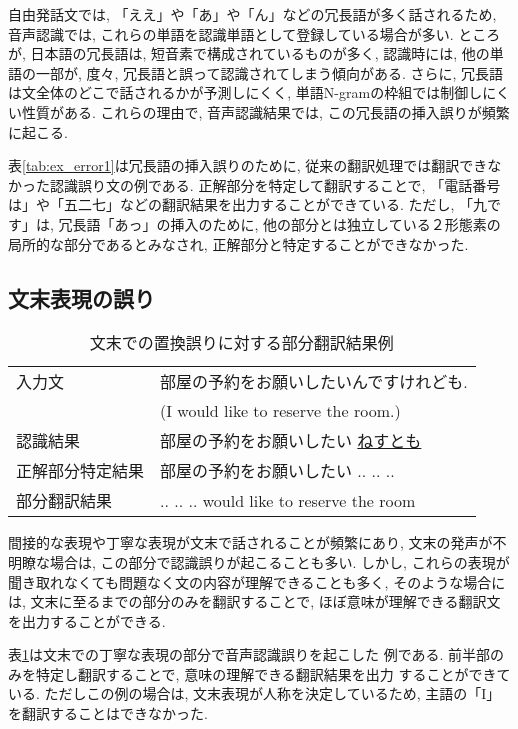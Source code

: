 自由発話文では, 「ええ」や「あ」や「ん」などの冗長語が多く話されるため, 
音声認識では, これらの単語を認識単語として登録している場合が多い. 
ところが, 日本語の冗長語は, 短音素で構成されているものが多く, 認識時には, 他の単語の一部が, 度々, 冗長語と誤って認識されてしまう傾向がある. 
さらに, 冗長語は文全体のどこで話されるかが予測しにくく, 単語N-gramの枠組では制御しにくい性質がある. 
これらの理由で, 音声認識結果では, この冗長語の挿入誤りが頻繁に起こる. 

表\ref{tab:ex_error1}は冗長語の挿入誤りのために, 従来の翻訳処理では翻訳できなかった認識誤り文の例である. 正解部分を特定して翻訳することで, 「電話番号は」や「五二七」などの翻訳結果を出力することができている. 
ただし, 「九です」は, 冗長語「あっ」の挿入のために, 他の部分とは独立している２形態素の局所的な部分であるとみなされ, 正解部分と特定することができなかった. 

\subsection{文末表現の誤り}

\begin{table}
\caption{文末での置換誤りに対する部分翻訳結果例}
\label{tab:ex_error2}
\center
\begin{tabular}{|l|l|}
\hline
入力文 & 部屋の予約をお願いしたいんですけれども. \\
               & (I would like to reserve the room.)\\ \hline
認識結果  & 部屋の予約をお願いしたい \underline{ねすとも} \\ \hline
正解部分特定結果 & 部屋の予約をお願いしたい .. .. ..\\ \hline
部分翻訳結果     & .. .. .. would like to reserve the room  \\ \hline
 \end{tabular}
\end{table}


間接的な表現や丁寧な表現が文末で話されることが頻繁にあり, 
文末の発声が不明瞭な場合は, この部分で認識誤りが起こることも多い. 
しかし, これらの表現が聞き取れなくても問題なく文の内容が理解できることも多く, 
そのような場合には, 文末に至るまでの部分のみを翻訳することで, 
ほぼ意味が理解できる翻訳文を出力することができる. 

表\ref{tab:ex_error2}は文末での丁寧な表現の部分で音声認識誤りを起こした
例である. 前半部のみを特定し翻訳することで, 意味の理解できる翻訳結果を出力
することができている. ただしこの例の場合は, 文末表現が人称を決定しているため, 
主語の「I」を翻訳することはできなかった. 

